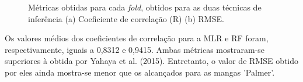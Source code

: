 \begin{figure}[H]
\centering
	\caption{Métricas obtidas para cada \textit{fold}, obtidos para as duas técnicas de inferência (a) Coeficiente de correlação (R) (b) RMSE.}
	\label{fig:fold_sst_rgb}
\end{figure}

Os valores médios dos coeficientes de correlação para a MLR e RF foram, respectivamente, iguais a 0,8312 e 0,9415. Ambas métricas mostraram-se superiores à obtida por Yahaya et al. (2015). Entretanto, o valor de RMSE obtido por eles ainda mostra-se menor que os alcançados para as mangas 'Palmer'. 

